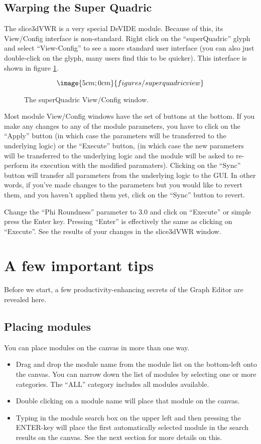 \subsection{Warping the Super Quadric}
The slice3dVWR is a very special DeVIDE module.  Because of this, its
View/Config interface is non-standard.  Right click on the
``superQuadric'' glyph and select ``View-Config'' to see a more
standard user interface (you can also just double-click on the glyph,
many users find this to be quicker).  This interface is shown in
figure \ref{figSuperQuadricView}.

\begin{figure}
$$\image{5cm;0cm}{figures/superquadricview}$$
\caption{The superQuadric View/Config window.}\label{figSuperQuadricView}
\end{figure}

Most module View/Config windows have the set of buttons at the bottom.
If you make any changes to any of the module parameters, you have to
click on the ``Apply'' button (in which case the parameters will be
transferred to the underlying logic) or the ``Execute'' button, (in
which case the new parameters will be transferred to the underlying
logic and the module will be asked to re-perform its execution with
the modified paramaters).  Clicking on the ``Sync'' button will
transfer all parameters from the underlying logic to the GUI.  In
other words, if you've made changes to the parameters but you would
like to revert them, and you haven't applied them yet, click on the
``Sync'' button to revert.

Change the ``Phi Roundness'' parameter to $3.0$ and click on
``Execute'' or simple press the Enter key.  Pressing ``Enter'' is
effectively the same as clicking on ``Execute''.  See the results of
your changes in the slice3dVWR window.

\section{A few important tips}
Before we start, a few productivity-enhancing secrets of the Graph
Editor are revealed here.

\subsection{Placing modules}
You can place modules on the canvas in more than one way.  
\begin{itemize}
\item Drag and drop the module name from the module list on the bottom-left
onto the canvas.  You can narrow down the list of modules by selecting
one or more categories.  The ``ALL'' category includes all modules
available.
\item Double clicking on a module name will place that module on the
  canvas.
\item Typing in the module search box on the upper left and then
  pressing the ENTER-key will place the first automatically selected
  module in the search results on the canvas.  See the next section
  for more details on this.
\end{itemize}

